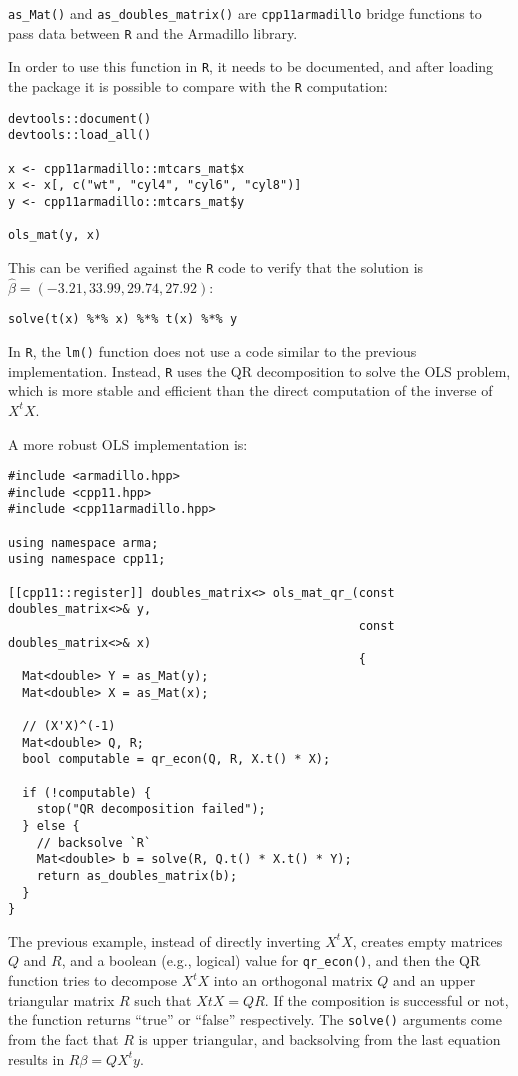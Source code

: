 \texttt{as\_Mat()} and \texttt{as\_doubles\_matrix()} are \texttt{cpp11armadillo} bridge functions to pass
data between \texttt{R} and the Armadillo library.

In order to use this function in \texttt{R}, it needs to be documented, and after
loading the package it is possible to compare with the \texttt{R} computation:

\begin{verbatim}
devtools::document()
devtools::load_all()

x <- cpp11armadillo::mtcars_mat$x
x <- x[, c("wt", "cyl4", "cyl6", "cyl8")]
y <- cpp11armadillo::mtcars_mat$y

ols_mat(y, x)
\end{verbatim}

This can be verified against the \texttt{R} code to verify that the solution is
\(\hat{\beta} = (-3.21, 33.99, 29.74, 27.92)\):

\begin{verbatim}
solve(t(x) %*% x) %*% t(x) %*% y
\end{verbatim}

In \texttt{R}, the \texttt{lm()} function does not use a code similar to the previous
implementation. Instead, \texttt{R} uses the QR decomposition to solve the OLS problem,
which is more stable and efficient than the direct computation of the
inverse of \(X^tX\).

A more robust OLS implementation is:

\begin{verbatim}
#include <armadillo.hpp>
#include <cpp11.hpp>
#include <cpp11armadillo.hpp>

using namespace arma;
using namespace cpp11;

[[cpp11::register]] doubles_matrix<> ols_mat_qr_(const doubles_matrix<>& y,
                                                 const doubles_matrix<>& x) 
                                                 {
  Mat<double> Y = as_Mat(y);
  Mat<double> X = as_Mat(x);

  // (X'X)^(-1)
  Mat<double> Q, R;
  bool computable = qr_econ(Q, R, X.t() * X);

  if (!computable) {
    stop("QR decomposition failed");
  } else {
    // backsolve `R`
    Mat<double> b = solve(R, Q.t() * X.t() * Y);
    return as_doubles_matrix(b);
  }
}
\end{verbatim}

The previous example, instead of directly inverting \(X^tX\), creates empty
matrices \(Q\) and \(R\), and a boolean (e.g., logical) value for \texttt{qr\_econ()},
and then the QR function tries to decompose \(X^tX\) into an orthogonal matrix
\(Q\) and an upper triangular matrix \(R\) such that \(XtX = QR\). If the
composition is successful or not, the function returns ``true'' or ``false''
respectively. The \texttt{solve()} arguments come from the fact that \(R\) is upper
triangular, and backsolving from the last equation results in
\(R\beta = QX^ty\).

